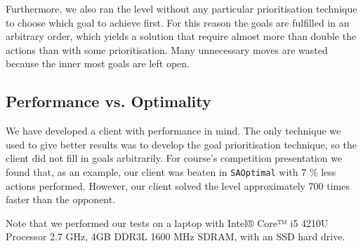 Furthermore, we also ran the level without any particular prioritisation technique to choose which goal to achieve first.
For this reason the goals are fulfilled in an arbitrary order, which yields a solution that require almost more than double the actions than with some prioritisation.
Many unnecessary moves are wasted because the inner most goals are left open.

\subsection{Performance vs. Optimality}
\label{sec:performance vs. optimality}

We have developed a client with performance in mind.
The only technique we used to give better results was to develop the goal prioritisation technique, so the client did not fill in goals arbitrarily.
For course's competition presentation we found that, as an example, our client was beaten in \texttt{SAOptimal} with 7 \% less actions performed. 
However, our client solved the level approximately 700 times faster than the opponent.

Note that we performed our tests on a laptop with Intel® Core™ i5 4210U Processor 2.7 GHz, 4GB DDR3L 1600 MHz SDRAM, with an SSD hard drive.
